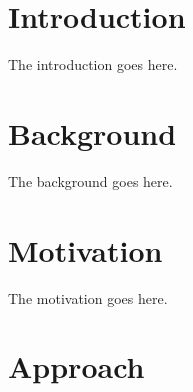 \documentclass[journal,9pt]{IEEEtran}
\begin{document}
\section{Introduction}
The introduction goes here.

\section{Background}

The background goes here.

\section{Motivation}

The motivation goes here.

\section{Approach}
\end{document}

